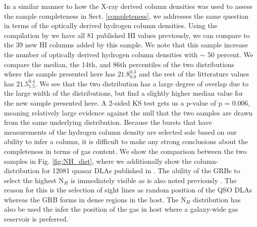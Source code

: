 \documentclass{aa}    %
\begin{document}
In a similar manner to how the X-ray derived column densities was used to assess
the sample completeness in Sect. \ref{completeness}, we addresses the same
question in terms of the optically derived hydrogen column densities. Using the
compilation by \citet{Tanvir2017} we have all 81 published HI values previously,
we can compare to the 39 new HI columns added by this sample. We note that this
sample increase the number of optically derived hydrogen column densities with
$\sim$ 50 percent. We compare the median, the 14th, and 86th percentiles of the
two distributions where the sample presented here has $21.8_{0.8}^{0.3}$ and the
rest of the litterature values has $21.5_{1.5}^{0.4}$. We see that the two
distribution has a large degree of overlap due to the large width of the
distributions, but find a slightly higher median value for the new sample
presented here. A 2-sided KS test gets us a p-value of p = 0.006, meaning
relatively large evidence against the null that the two samples are drawn from
the same underlying distribution. Because the bursts that have measurements of
the hydrogen column density are selected sole based on our ability to infer a
column, it is difficult to make any strong conclusions about the completeness in
terms of gas content. We show the comparison between the two samples in Fig.
\ref{fig:NH_dist}, where we additionally show the column-distribution for 12081
quasar DLAs published in \citet{Noterdaeme2012b}. The ability of the GRBs to
select the highest N$_H$ is immediately visible as is also noted previously
\citep{Prochaska2007, Fynbo2009}. The reason for this is the selection of sight
lines as random position of the QSO DLAs whereas the GRB forms in dense regions
in the host. The N$_H$ distribution has also be used the infer the position of
the gas in host \cite{Buchner2016} where a galaxy-wide gas reservoir is
preferred.
\end{document}
